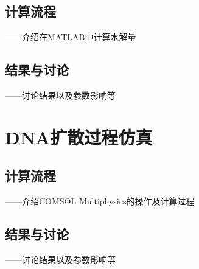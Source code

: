 \subsection{计算流程}
——介绍在MATLAB中计算水解量
\subsection{结果与讨论}
——讨论结果以及参数影响等

\section{DNA扩散过程仿真}
\subsection{计算流程}
——介绍COMSOL Multiphysics的操作及计算过程
\subsection{结果与讨论}
——讨论结果以及参数影响等